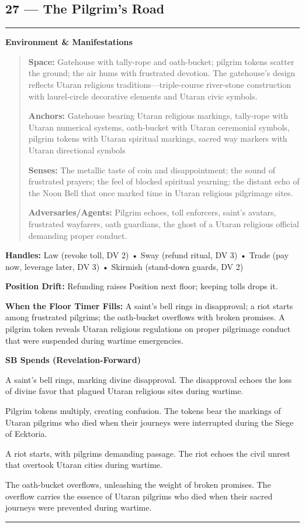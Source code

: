 \documentclass[18pt, letterpaper, twoside]{article}
\newenvironment{floorbox}[1]{%
    \begin{center}
    \begin{minipage}{0.95\textwidth}
    \subsection*{#1}
    \vspace{-0.5em}
    \rule{\textwidth}{0.5pt}
    \vspace{0.5em}
}{%
    \vspace{0.5em}
    \rule{\textwidth}{0.5pt}
    \end{minipage}
    \end{center}
}
\newenvironment{gmnote}[1]{%
    \vspace{0.5em}
    \noindent\textbf{#1}
    \begin{quote}
}{%
    \end{quote}
    \vspace{0.5em}
}
\newcommand{\handles}[1]{\noindent\textbf{Handles:} #1\par}
\newcommand{\sbitem}[2]{\item[#1 SB:] #2}
\begin{document}
\begin{floorbox}{27 --- The Pilgrim's Road}
\begin{gmnote}{Environment \& Manifestations}
\textbf{Space:} Gatehouse with tally-rope and oath-bucket; pilgrim tokens scatter the ground; the air hums with frustrated devotion. The gatehouse's design reflects Utaran religious traditions---triple-course river-stone construction with laurel-circle decorative elements and Utaran civic symbols.

\textbf{Anchors:} Gatehouse bearing Utaran religious markings, tally-rope with Utaran numerical systems, oath-bucket with Utaran ceremonial symbols, pilgrim tokens with Utaran spiritual markings, sacred way markers with Utaran directional symbols

\textbf{Senses:} The metallic taste of coin and disappointment; the sound of frustrated prayers; the feel of blocked spiritual yearning; the distant echo of the Noon Bell that once marked time in Utaran religious pilgrimage sites.

\textbf{Adversaries/Agents:} Pilgrim echoes, toll enforcers, saint's avatars, frustrated wayfarers, oath guardians, the ghost of a Utaran religious official demanding proper conduct.
\end{gmnote}

\handles{Law (revoke toll, DV 2) • Sway (refund ritual, DV 3) • Trade (pay now, leverage later, DV 3) • Skirmish (stand-down guards, DV 2)}

\textbf{Position Drift:} Refunding raises Position next floor; keeping tolls drops it.

\textbf{When the Floor Timer Fills:} A saint's bell rings in disapproval; a riot starts among frustrated pilgrims; the oath-bucket overflows with broken promises. A pilgrim token reveals Utaran religious regulations on proper pilgrimage conduct that were suspended during wartime emergencies.

\textbf{SB Spends (Revelation-Forward)}
\begin{description}[leftmargin=*, style=unboxed]
    \sbitem{1}{A saint's bell rings, marking divine disapproval. The disapproval echoes the loss of divine favor that plagued Utaran religious sites during wartime.}
    \sbitem{2}{Pilgrim tokens multiply, creating confusion. The tokens bear the markings of Utaran pilgrims who died when their journeys were interrupted during the Siege of Ecktoria.}
    \sbitem{3}{A riot starts, with pilgrims demanding passage. The riot echoes the civil unrest that overtook Utaran cities during wartime.}
    \sbitem{4+}{The oath-bucket overflows, unleashing the weight of broken promises. The overflow carries the essence of Utaran pilgrims who died when their sacred journeys were prevented during wartime.}
\end{description}


\end{floorbox}
\end{document}
